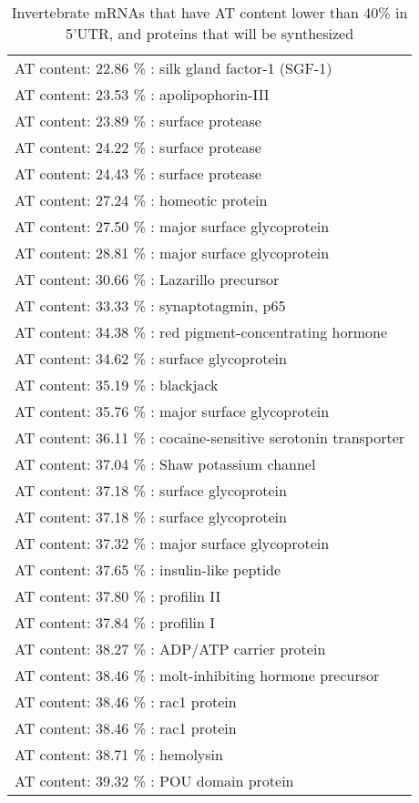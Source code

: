\begin{table}
\begin{tiny}
\begin{center}
\begin{tabular}{|l|}
\hline
 AT content: 22.86 \% : silk gland factor-1 (SGF-1)
\\ AT content: 23.53 \% : apolipophorin-III
\\ AT content: 23.89 \% : surface protease
\\ AT content: 24.22 \% : surface protease
\\ AT content: 24.43 \% : surface protease
\\ AT content: 27.24 \% : homeotic protein
\\ AT content: 27.50 \% : major surface glycoprotein
\\ AT content: 28.81 \% : major surface glycoprotein
\\ AT content: 30.66 \% : Lazarillo precursor
\\ AT content: 33.33 \% : synaptotagmin, p65
\\ AT content: 34.38 \% : red pigment-concentrating hormone
\\ AT content: 34.62 \% : surface glycoprotein
\\ AT content: 35.19 \% : blackjack
\\ AT content: 35.76 \% : major surface glycoprotein
\\ AT content: 36.11 \% : cocaine-sensitive serotonin transporter
\\ AT content: 37.04 \% : Shaw potassium channel
\\ AT content: 37.18 \% : surface glycoprotein
\\ AT content: 37.18 \% : surface glycoprotein
\\ AT content: 37.32 \% : major surface glycoprotein
\\ AT content: 37.65 \% : insulin-like peptide
\\ AT content: 37.80 \% : profilin II
\\ AT content: 37.84 \% : profilin I
\\ AT content: 38.27 \% : ADP/ATP carrier protein
\\ AT content: 38.46 \% : molt-inhibiting hormone precursor
\\ AT content: 38.46 \% : rac1 protein
\\ AT content: 38.46 \% : rac1 protein
\\ AT content: 38.71 \% : hemolysin
\\ AT content: 39.32 \% : POU domain protein
\\
\hline
\end{tabular}
\end{center}
\end{tiny}
\caption{Invertebrate mRNAs that have AT content lower than 40\% in
5'UTR, and proteins that will be synthesized}
\label{at_40}
\end{table}

